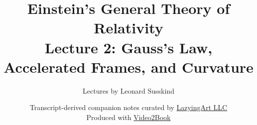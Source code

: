 \documentclass[11pt,oneside]{book}
\begin{document}
\hypersetup{pageanchor=false}
\frontmatter
\title{Einstein's General Theory of Relativity\\[0.45em]
\large Lecture 2: Gauss's Law, Accelerated Frames, and Curvature}
\author{Lectures by Leonard Susskind}
\date{Transcript-derived companion notes curated by
\href{https://lazying.art}{LazyingArt LLC}\\[0.35em]
\small Produced with
\href{https://github.com/lachlanchen/Video2Book}{Video2Book}}
\maketitle
\hypersetup{pageanchor=true}
\mainmatter

\end{document}
